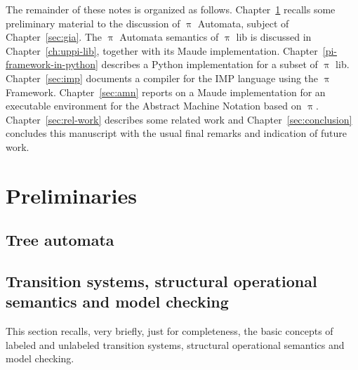 \documentclass[a4paper,openany]{book}
\begin{document}
The remainder of these notes is organized as follows. Chapter~\ref{sec:preliminaries} recalls some preliminary material to the discussion of $\uppi$ Automata, subject of Chapter~\ref{sec:gia}. The $\uppi$ Automata semantics of $\uppi$ lib is discussed in Chapter~\ref{ch:uppi-lib}, together with its Maude implementation. Chapter~\ref{pi-framework-in-python} describes a Python implementation for a subset of $\uppi$ lib. Chapter~\ref{sec:imp} documents a compiler for the IMP language using the $\uppi$ Framework. Chapter~\ref{sec:amn} reports on a Maude implementation for an executable environment for the Abstract Machine Notation based on $\uppi$.
Chapter~\ref{sec:rel-work} describes some related work and Chapter~\ref{sec:conclusion} concludes this manuscript with the usual final remarks and indication of future work.

\chapter{Preliminaries}\label{sec:preliminaries}


\section{Tree automata}\label{sec:tree-automata}

\section{Transition systems, structural operational semantics and model checking}\label{sec:pre-os}

This section recalls, very briefly, just for completeness, the basic concepts of labeled and unlabeled transition systems, structural operational semantics and model checking.
\end{document}
